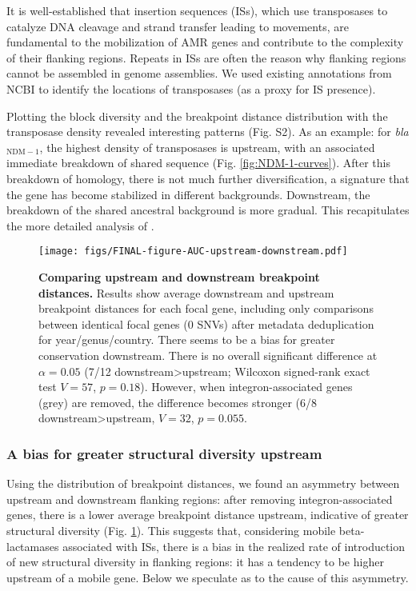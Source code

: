 \documentclass[rmp,superscriptaddress,11pt]{revtex4-1}
\newcommand{\bla}[1]{\textit{bla}$_\mathrm{#1}$}
\begin{document}
\noindent It is well-established that insertion sequences (ISs), which use transposases to catalyze DNA cleavage and strand transfer leading to movements, are fundamental to the mobilization of AMR genes and contribute to the complexity of their flanking regions. Repeats in ISs are often the reason why flanking regions cannot be assembled in genome assemblies. We used existing annotations from NCBI to identify the locations of transposases (as a proxy for IS presence). \par
Plotting the block diversity and the breakpoint distance distribution with the transposase density revealed interesting patterns (Fig. S2). As an example: for \bla{NDM-1}, the highest density of transposases is upstream, with an associated immediate breakdown of shared sequence (Fig. \ref{fig:NDM-1-curves}). After this breakdown of homology, there is not much further diversification, a signature that the gene has become stabilized in different backgrounds. Downstream, the breakdown of the shared ancestral background is more gradual. This recapitulates the more detailed analysis of \textcite{Acman2022}.\par


\begin{figure}
    \centering
    \texttt{[image: figs/FINAL-figure-AUC-upstream-downstream.pdf]}
    \caption{\textbf{Comparing upstream and downstream breakpoint distances.} Results show average downstream and upstream breakpoint distances for each focal gene, including only comparisons between identical focal genes (0 SNVs) after metadata deduplication for year/genus/country. There seems to be a bias for greater conservation downstream. There is no overall significant difference at $\alpha=0.05$ (7/12 downstream>upstream; Wilcoxon signed-rank exact test $V=57$, $p=0.18$). However, when integron-associated genes (grey) are removed, the difference becomes stronger (6/8 downstream>upstream, $V=32$, $p=0.055$.}
    \label{fig:auc-correlation-up-down}
\end{figure}

\subsubsection{A bias for greater structural diversity upstream}
\noindent Using the distribution of breakpoint distances, we found an asymmetry between upstream and downstream flanking regions: after removing integron-associated genes, there is a lower average breakpoint distance upstream, indicative of greater structural diversity (Fig. \ref{fig:auc-correlation-up-down}). This suggests that, considering mobile beta-lactamases associated with ISs, there is a bias in the realized rate of introduction of new structural diversity in flanking regions: it has a tendency to be higher upstream of a mobile gene. Below we speculate as to the cause of this asymmetry.
\end{document}
